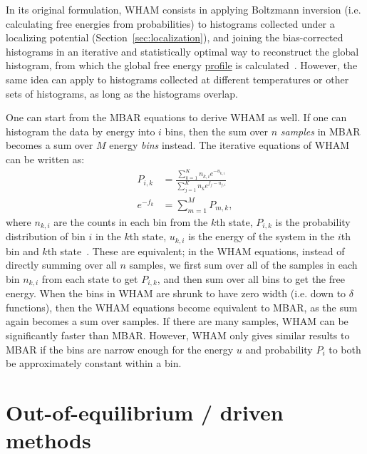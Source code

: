 \documentclass[9pt,review]{livecoms}
\begin{document}
In its original formulation, WHAM consists in applying Boltzmann inversion (i.e. calculating free energies from probabilities) to histograms collected under a localizing potential (Section~\ref{sec:localization}), and joining the bias-corrected histograms in an iterative and statistically optimal way to reconstruct the global histogram, from which the global free energy \hyperlink{ref:FES} {profile} is calculated~\cite{kumars:WHAM}.  However, the same idea can apply to histograms collected at different temperatures or other sets of histograms, as long as the histograms overlap.

One can start from the MBAR equations to derive WHAM as well. If one can histogram the data by energy into $i$ bins, then the sum over $n$ \textit{samples} in MBAR becomes a sum over $M$ energy \textit{bins} instead. The iterative equations of WHAM can be written as:
\begin{align}
P_{i,k} &= \frac{\sum_{k=1}^K n_{k,i} e^{-u_{k,i}}}{\sum_{j=1}^{K}n_k {e^{f_j-u_{j,i}}}}
\\
e^{-f_k} &= \sum_{m=1}^M P_{m,k},
\end{align}
where $n_{k,i}$ are the counts in each bin from the $k$th state, $P_{i,k}$ is the probability distribution of bin $i$ in the $k$th state,  $u_{k,i}$ is the energy of the system in the $i$th bin and $k$th state~\cite{kumars:WHAM}. These are equivalent; in the WHAM equations, instead of directly summing over all $n$ samples, we first sum over all of the samples in each bin $n_{k,i}$ from each state to get $P_{i,k}$, and then sum over all bins to get the free energy. When the bins in WHAM are shrunk to have zero width (i.e. down to $\delta$ functions), then the WHAM equations become equivalent to MBAR, as the sum again becomes a sum over samples. If there are many samples, WHAM can be significantly faster than MBAR. However, WHAM only gives similar results to MBAR if the bins are narrow enough for the energy $u$ and probability $P_i$ to both be approximately constant within a bin.

\section{Out-of-equilibrium / driven methods}
\label{sec:Out-of-equilibrium_driven}
\end{document}
